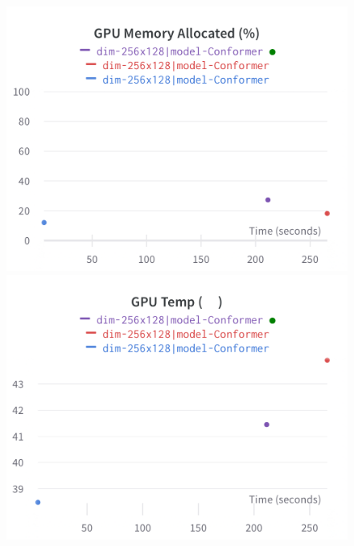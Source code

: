 \documentclass{article}
\begin{document}
\begin{figure}[!htb]
\includegraphics[width=\linewidth]{charts/Section-4-Panel-2-cbkkgvfxh}
\caption{}
\endminipage\hfill
{}
\includegraphics[width=\linewidth]{charts/Section-4-Panel-3-gtmzfeefm}
\caption{}
\endminipage
\end{figure}
\end{document}
